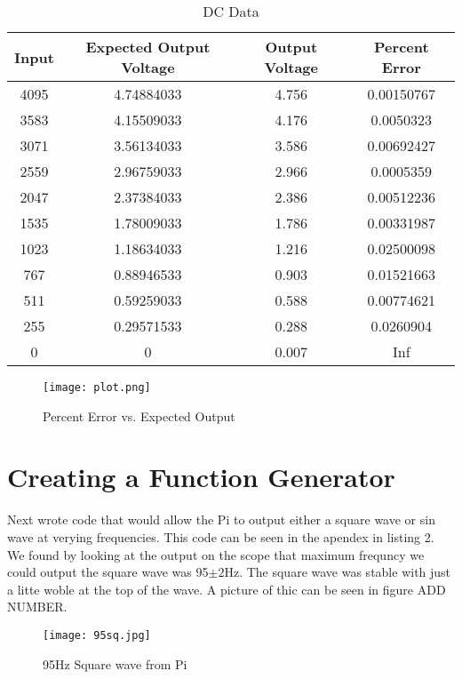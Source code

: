 \documentclass[prl,12pt,notitlepage,aps,onecolumn,superscriptaddress]{revtex4-1}
\begin{document}
\begin{table}[htbp]
  \centering
  \caption{DC Data}
    \begin{tabular}{c|c|c|c}
    \toprule
    Input & Expected Output Voltage & Output Voltage & Percent Error \\
    \midrule
    4095  & 4.74884033 & 4.756 & 0.00150767 \\
    3583  & 4.15509033 & 4.176 & 0.0050323 \\
    3071  & 3.56134033 & 3.586 & 0.00692427 \\
    2559  & 2.96759033 & 2.966 & 0.0005359 \\
    2047  & 2.37384033 & 2.386 & 0.00512236 \\
    1535  & 1.78009033 & 1.786 & 0.00331987 \\
    1023  & 1.18634033 & 1.216 & 0.02500098 \\
    767   & 0.88946533 & 0.903 & 0.01521663 \\
    511   & 0.59259033 & 0.588 & 0.00774621 \\
    255   & 0.29571533 & 0.288 & 0.0260904 \\
    0     & 0     & 0.007 & Inf \\
    \bottomrule
    \end{tabular}%
  \label{tab:addlabel}%
\end{table}%


\begin{figure}[h]
\begin{center}
\texttt{[image: plot.png]}
\end{center}
\caption{\label{fig:pic} Percent Error vs. Expected Output}
\end{figure}

\section{Creating a Function Generator}
Next wrote code that would allow the Pi to output either a square wave or sin wave at verying frequencies. This code can be seen in the apendex in listing 2. We found by looking at the output on the scope that maximum frequncy we could output the square wave was 95$\pm2$Hz. The square wave was stable with just a litte woble at the top of the wave. A picture of thic can be seen in figure ADD NUMBER.

\begin{figure}[h]
\begin{center}
\texttt{[image: 95sq.jpg]}
\end{center}
\caption{\label{fig:pic} 95Hz Square wave from Pi}
\end{figure}
\end{document}
